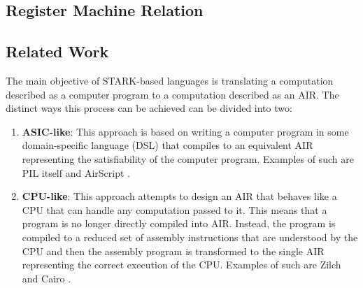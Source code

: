     




\subsection{Register Machine Relation}



\subsection{Related Work}

The main objective of STARK-based languages is translating a computation described as a computer program to a computation described as an AIR. The distinct ways this process can be achieved can be divided into two:
\begin{enumerate}
    \item \textbf{ASIC-like}: This approach is based on writing a computer program in some domain-specific language (DSL) that compiles to an equivalent AIR representing the satisfiability of the computer program. Examples of such are PIL itself and AirScript \cite{AirScript}.
    \item \textbf{CPU-like}: This approach attempts to design an AIR that behaves like a CPU that can handle any computation passed to it. This means that a program is no longer directly compiled into AIR. Instead, the program is compiled to a reduced set of assembly instructions that are understood by the CPU and then the assembly program is transformed to the single AIR representing the correct execution of the CPU. Examples of such are Zilch \cite{EPRINT:MouTso20} and Cairo \cite{EPRINT:GolPapRia21}.
\end{enumerate}

